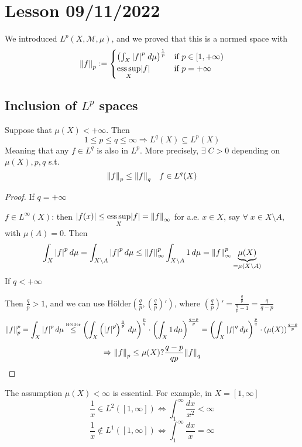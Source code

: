 \section{Lesson 09/11/2022}
We introduced \(L^p(X, \mathcal{M}, \mu)\), and we proved that this is a normed space with 
\[
    \norm{f}_p := \begin{cases}
        \left( \int_X \abs{f}^p \; d\mu \right)^{\frac{1}{p}} & \text{if } p\in [1, +\infty) \\
        \underset{X}{\text{ess}\, \text{sup}}\abs{f} & \text{if } p = +\infty
    \end{cases}
\]
\subsection*{Inclusion of \(L^p\) spaces}
\begin{theorem}
    Suppose that \(\mu(X) < +\infty\). Then 
    \[
        1 \leq p \leq q \leq \infty \Rightarrow L^q(X) \subseteq L^p(X)
    \]
    Meaning that any \(f \in L^q\) is also in \(L^p\). More precisely, \(\exists \; C > 0\) depending on \(\mu(X), p, q\) s.t.
    \[
        \norm{f}_p \leq \norm{f}_q \quad f \in L^q(X)
    \]
\end{theorem}
\begin{proof}
    If \(q = +\infty\)
    
    \(f \in L^\infty(X)\): then \(\abs{f(x)} \leq \underset{X}{\text{ess}\, \text{sup}}\abs{f} = \norm{f}_\infty\) for a.e. \(x \in X\), say \(\forall \; x \in X \setminus A\), with \(\mu(A) = 0\). Then 
    \[
        \int_X \abs{f}^p \, d\mu = \int_{X\setminus A} \abs{f}^p \, d\mu \leq \norm{f}_{\infty}^p \int_{X\setminus A} 1 \,d\mu = \norm{f}_\infty^p \underbrace{\mu(X)}_{= \mu(X\setminus A)}
    \]
    If \(q < +\infty\)

    Then \(\frac{q}{p} > 1\), and we can use Hölder\(\left(\frac{q}{p},\left( \frac{q}{p} \right)' \right)\), where \(\left( \frac{q}{p} \right)' = \frac{\frac{q}{p}}{\frac{q}{p}-1} = \frac{q}{q-p}\)
    \[
        \norm{f}_p^p = \int_X \abs{f}^p \, d\mu \overset{\text{\tiny{Hölder}}}{\leq} \left( \int_X \left( \abs{f}^{\not p} \right)^{\frac{q}{\not p}} \, d\mu\right)^{\frac{p}{q}}\cdot \left( \int_X 1 \, d\mu \right)^{\frac{q-p}{p}} = \left( \int_X \abs{f}^{q} \, d\mu\right)^{\frac{p}{q}}\cdot \left( \mu(X)\right)^{\frac{q-p}{p}}
    \]
    \[
        \Rightarrow \norm{f}_p \leq \mu(X)?{\frac{q-p}{qp}} \norm{f}_q
    \]
\end{proof}

The assumption \(\mu(X)< \infty\) is essential. For example, in \(X = [1, \infty]\)
\[
    \frac{1}{x} \in L^2([1, \infty]) \Leftrightarrow \int_1^\infty \frac{dx}{x^2} < \infty
\]
\[
    \frac{1}{x} \notin L^1 ([1, \infty]) \Leftrightarrow \int_1^\infty \frac{dx}{x} = \infty
\]

